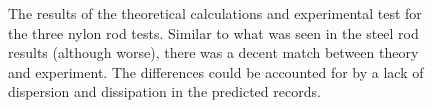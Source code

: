  \begin{figure}[ht!]
\begin{subfigmatrix}{3}
\end{subfigmatrix}

   \caption
   { \label{nylonThExp}
The results of the theoretical calculations and experimental test for the three nylon rod tests. Similar to what was seen in the steel rod results (although worse),  there was a decent match between theory and experiment. The differences could be accounted for by a lack of dispersion and dissipation in the predicted records.
 }
 \end{figure}
 
